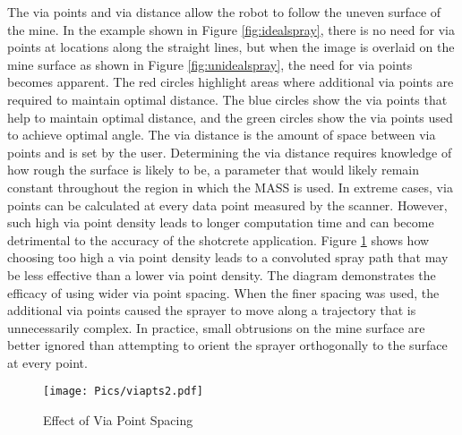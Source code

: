 The via points and via distance allow the robot to follow the uneven surface of the mine. In the example shown in Figure \ref{fig:idealspray}, there is no need for via points at locations along the straight lines, but when the image is overlaid on the mine surface as shown in Figure \ref{fig:unidealspray}, the need for via points becomes apparent. The red circles highlight areas where additional via points are required to maintain optimal distance. The blue circles show the via points that help to maintain optimal distance, and the green circles show the via points used to achieve optimal angle. The via distance is the amount of space between via points and is set by the user. Determining the via distance requires knowledge of how rough the surface is likely to be, a parameter that would likely remain constant throughout the region in which the MASS is used. In extreme cases, via points can be calculated at every data point measured by the scanner. However, such high via point density leads to longer computation time and can become detrimental to the accuracy of the shotcrete application. Figure \ref{fig:viapts} shows how choosing too high a via point density leads to a convoluted spray path that may be less effective than a lower via point density. The diagram demonstrates the efficacy of using wider via point spacing. When the finer spacing was used, the additional via points caused the sprayer to move along a trajectory that is unnecessarily complex. In practice, small obtrusions on the mine surface are better ignored than attempting to orient the sprayer orthogonally to the surface at every point.\\

\begin{figure}[h]
    \centering
    \texttt{[image: Pics/viapts2.pdf]}
    \caption{Effect of Via Point Spacing}
    \label{fig:viapts}
\end{figure}

